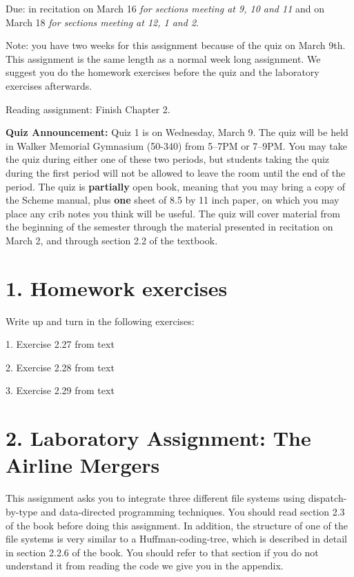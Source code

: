 \vpar
Due: in recitation on March 16 {\it for sections meeting at 9, 10 and
11} and on March 18 {\it for sections meeting at 12, 1 and 2}.

\vpar
Note: you have two weeks for this assignment because of the quiz on
March 9th.  This assignment is the same length as a normal week long
assignment.  We suggest you do the homework exercises before the quiz
and the laboratory exercises afterwards.

\vpar
Reading assignment: Finish Chapter 2.

\vskip 20pt

{\bf Quiz Announcement:}  Quiz 1 is on Wednesday, March 9.  The quiz
will be held in Walker Memorial Gymnasium (50-340) from 5--7PM or
7--9PM.  You may take the quiz during either one of these two periods,
but students taking the quiz during the first period will not be allowed
to leave the room until the end of the period.  The quiz is {\bf
partially} open book, meaning that you may bring a copy of the Scheme
manual, plus {\bf one} sheet of 8.5 by 11 inch paper, on which you may
place any crib notes you think will be useful.  The quiz will cover
material from the beginning of the semester through the material
presented in recitation on March 2, and through section 2.2 
of the textbook.  

\chapter{1. Homework exercises}

Write up and turn in the following exercises:

1. Exercise 2.27 from text

2. Exercise 2.28 from text

3. Exercise 2.29 from text


\chapter{2. Laboratory Assignment: The Airline Mergers}

This assignment asks you to integrate three different file systems
using dispatch-by-type and data-directed programming techniques.
You should read section 2.3 of the book before doing this assignment.
In addition, the structure of one of the file systems is very
similar to a Huffman-coding-tree, which is described in detail in
section 2.2.6 of the book.  You should refer to that section if
you do not understand it from reading the code we give you in the
appendix.

